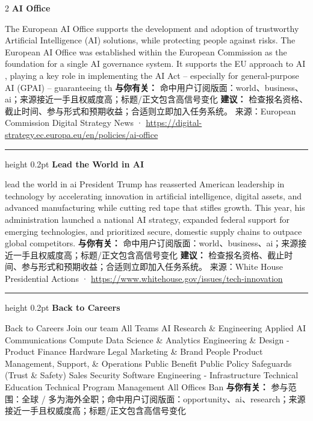 \documentclass[10.5pt]{ctexart}
\begin{document}
\begin{multicols}{2}
{\large\bfseries AI Office}\par
The European AI Office supports the development and adoption of trustworthy Artificial Intelligence (AI) solutions, while protecting people against risks. The European AI Office was established within the European Commission as the foundation for a single AI governance system. It supports the EU approach to AI , playing a key role in implementing the AI Act – especially for general-purpose AI (GPAI) – guaranteeing th
\textbf{与你有关：} 命中用户订阅版面：world、business、ai；来源接近一手且权威度高；标题/正文包含高信号变化
\textbf{建议：} 检查报名资格、截止时间、参与形式和预期收益；合适则立即加入任务系统。
{\footnotesize\color{ormuted} 来源：European Commission Digital Strategy News · \url{https://digital-strategy.ec.europa.eu/en/policies/ai-office}}
\vspace{2mm}
\hrule height 0.2pt
\vspace{2mm}
{\large\bfseries Lead the World in AI}\par
lead the world in ai President Trump has reasserted American leadership in technology by accelerating innovation in artificial intelligence, digital assets, and advanced manufacturing while cutting red tape that stifles growth. This year, his administration launched a national AI strategy, expanded federal support for emerging technologies, and prioritized secure, domestic supply chains to outpace global competitors.
\textbf{与你有关：} 命中用户订阅版面：world、business、ai；来源接近一手且权威度高；标题/正文包含高信号变化
\textbf{建议：} 检查报名资格、截止时间、参与形式和预期收益；合适则立即加入任务系统。
{\footnotesize\color{ormuted} 来源：White House Presidential Actions · \url{https://www.whitehouse.gov/issues/tech-innovation}}
\vspace{2mm}
\hrule height 0.2pt
\vspace{2mm}
{\large\bfseries Back to Careers}\par
Back to Careers Join our team All Teams AI Research \& Engineering Applied AI Communications Compute Data Science \& Analytics Engineering \& Design - Product Finance Hardware Legal Marketing \& Brand People Product Management, Support, \& Operations Public Benefit Public Policy Safeguards (Trust \& Safety) Sales Security Software Engineering - Infrastructure Technical Education Technical Program Management All Offices Ban
\textbf{与你有关：} 参与范围：全球 / 多为海外全职；命中用户订阅版面：opportunity、ai、research；来源接近一手且权威度高；标题/正文包含高信号变化

\end{multicols}
\end{document}
